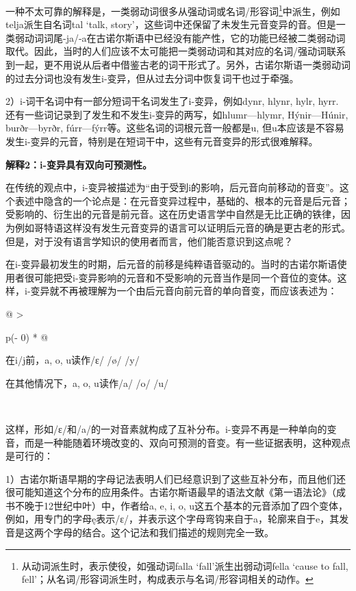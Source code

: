 一种不太可靠的解释是，一类弱动词很多从强动词或名词/形容词\footnote{从动词派生时，表示使役，如强动词falla
  `fall'派生出弱动词fella `cause to fall,
  fell'；从名词/形容词派生时，构成表示与名词/形容词相关的动作。}中派生，例如telja派生自名词tal
`talk,
story'，这些词中还保留了未发生元音变异的音。但是一类弱动词词尾-ja/-a在古诺尔斯语中已经没有能产性，它的功能已经被二类弱动词取代。因此，当时的人们应该不太可能把一类弱动词和其对应的名词/强动词联系到一起，更不用说从后者中借鉴古老的词干形式了。另外，古诺尔斯语一类弱动词的过去分词也没有发生i-变异，但从过去分词中恢复词干也过于牵强。

2）i-词干名词中有一部分短词干名词发生了i-变异，例如dynr, hlynr, hylr,
hyrr. 还有一些词记录到了发生和不发生i-变异的两写，如hlumr---hlymr,
Hýnir---Húnir, burðr---byrðr,
fúrr---fýrr等。这些名词的词根元音一般都是u,
但u本应该是不容易发生i-变异的元音，特别是在短词干中，这些有元音变异的形式很难解释。

\textbf{解释2：i-变异具有双向可预测性。}

在传统的观点中，i-变异被描述为``由于受到i的影响，后元音向前移动的音变''。这个表述中隐含的一个论点是：在元音变异过程中，基础的、根本的元音是后元音；受影响的、衍生出的元音是前元音。这在历史语言学中自然是无比正确的铁律，因为例如哥特语这样没有发生元音变异的语言可以证明后元音的确是更古老的形式。但是，对于没有语言学知识的使用者而言，他们能否意识到这点呢？

在i-变异最初发生的时期，后元音的前移是纯粹语音驱动的。当时的古诺尔斯语使用者很可能把受i-变异影响的元音和不受影响的元音当作是同一个音位的变体。这样，i-变异就不再被理解为一个由后元音向前元音的单向音变，而应该表述为：

\begin{longtable}[]{@{}
  >{\raggedright\arraybackslash}p{(\columnwidth - 0\tabcolsep) * }@{}}
  \toprule\noalign{}
  \begin{minipage}[b]{\linewidth}\raggedright
    在i/j前，a, o, u读作/ɛ/ /ø/ /y/

    在其他情况下，a, o, u读作/a/ /o/ /u/
  \end{minipage} \\
  \midrule\noalign{}
  \endhead
  \bottomrule\noalign{}
  \endlastfoot
\end{longtable}

这样，形如/ɛ/和/a/的一对音素就构成了互补分布。i-变异不再是一种单向的变音，而是一种能随着环境改变的、双向可预测的音变。有一些证据表明，这种观点是可行的：

1）古诺尔斯语早期的字母记法表明人们已经意识到了这些互补分布，而且他们还很可能知道这个分布的应用条件。古诺尔斯语最早的语法文献《第一语法论》（成书不晚于12世纪中叶）中，作者给a,
e, i, o,
u这五个基本的元音添加了四个变体，例如，用专门的字母ę表示/ɛ/，并表示这个字母弯钩来自于a，轮廓来自于e，其发音是这两个字母的结合。这个记法和我们描述的规则完全一致。

